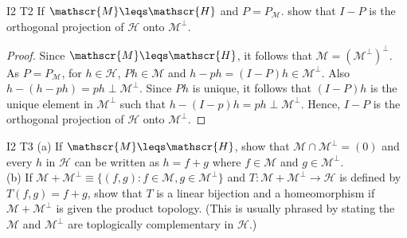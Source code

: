 \begin{exercise}{I2 T2}{}
    If $\mathscr{M}\leqs \mathscr{H}$ and $P=P_{\mathscr{M}}$. 
    show that $I-P$ is the orthogonal projection of $\mathscr{H}$ onto $\mathscr{M}^{\perp}$.
\end{exercise}
\begin{proof}
    Since $\mathscr{M}\leqs \mathscr{H}$, it follows that $\mathscr{M}=(\mathscr{M}^{\perp})^{\perp}$.
    As $P=P_{\mathscr{M}}$, for $h\in\mathscr{H}$, $Ph\in \mathscr{M}$ and $h-ph=(I-P)h\in \mathscr{M}^{\perp}$.
    Also $h-(h-ph)=ph\perp \mathscr{M}^{\perp}$. 
    Since $Ph$ is unique, it follows that $(I-P)h$ is the unique element in $\mathscr{M}^{\perp}$ such that $h-(I-p)h=ph\perp \mathscr{M}^{\perp}$.
    Hence, $I-P$ is the orthogonal projection of $\mathscr{H}$ onto $\mathscr{M}^{\perp}$.
\end{proof}

\begin{exercise}{I2 T3}{}
    (a) If $\mathscr{M}\leqs \mathscr{H}$, show that $\mathscr{M}\cap \mathscr{M}^{\perp}=(0)$ 
    and every $h$ in $\mathscr{H}$ can be written as $h=f+g$ where $f\in \mathscr{M}$ and $g\in \mathscr{M}^{\perp}$. 
    \\
    (b) If $\mathscr{M}+\mathscr{M}^{\perp}\equiv \{(f,g):f\in\mathscr{M},g\in\mathscr{M}^{\perp}\}$ and $T:\mathscr{M}+\mathscr{M}^{\perp}\rightarrow \mathscr{H}$
    is defined by $T(f,g)=f+g$, show that $T$ is a linear bijection and a homeomorphism
    if $\mathscr{M}+\mathscr{M}^{\perp}$ is given the product topology.
    (This is usually phrased by stating the $\mathscr{M}$ and $\mathscr{M}^{\perp}$ are toplogically complementary in $\mathscr{H}$.) 
\end{exercise}

